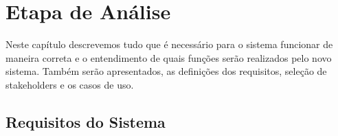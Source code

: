 
\chapter{Etapa de An\'{a}lise}

Neste capítulo descrevemos tudo que é necessário para o sistema funcionar de maneira correta e o entendimento de quais funções serão realizados pelo novo sistema. Também serão apresentados, as definições dos requisitos, seleção de stakeholders e os casos de uso.


\section{Requisitos do Sistema}

